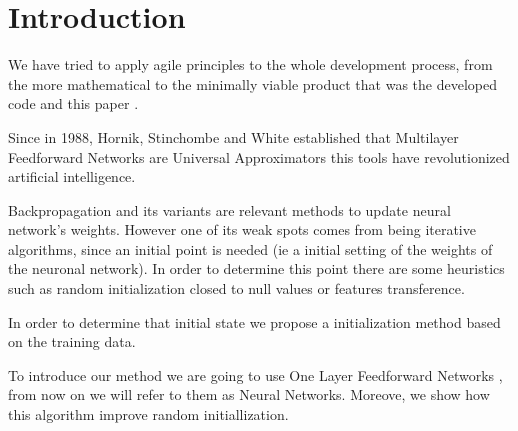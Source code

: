 \section*{Introduction} %

We have tried to apply agile principles to the whole development process, from
the more mathematical to the minimally viable product that was the developed
code and this paper \cite{DBLP:journals/corr/abs-2104-12545}.

Since in 1988, Hornik, Stinchombe and White established
that Multilayer Feedforward Networks are Universal Approximators \cite{HORNIK1989359} this tools have revolutionized artificial intelligence. 

Backpropagation \cite{backpropagation-Hinton} and its 
variants are relevant methods to update neural 
network's weights. However one of its weak spots comes from being iterative 
algorithms, since an initial point is needed (ie a initial setting of the weights of the neuronal network). In order to determine this point 
there are some heuristics such as random initialization
closed to null values or features transference. 

In order to determine that initial state we propose a initialization method based on the training data. 

To introduce our method we are going to use One Layer
Feedforward Networks \cite{HORNIK1989359} , from now on we will refer to them as Neural Networks. 
Moreove, we show how this algorithm improve random initiallization. 
